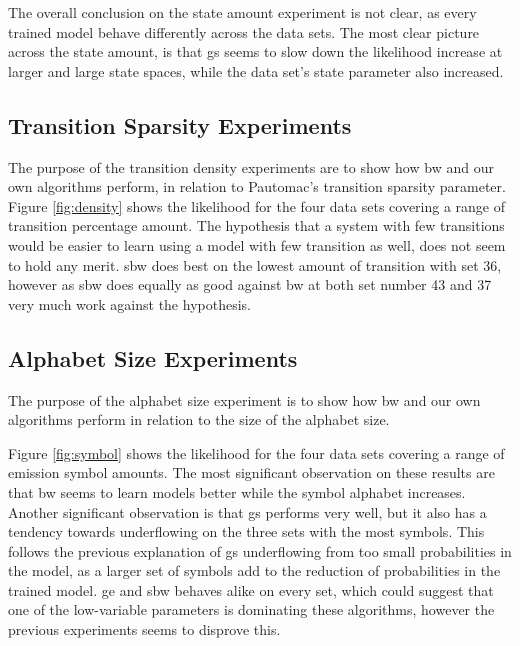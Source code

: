 The overall conclusion on the state amount experiment is not clear, as every trained model behave differently across the data sets. The most clear picture across the state amount, is that \gls{gs} seems to slow down the likelihood increase at larger and large state spaces, while the data set's state parameter also increased.\\
	
\FloatBarrier

\subsection{Transition Sparsity Experiments}

The purpose of the transition density experiments are to show how \gls{bw} and our own algorithms perform, in relation to Pautomac's transition sparsity parameter.\\

Figure \ref{fig:density} shows the likelihood for the four data sets covering a range of transition percentage amount. The hypothesis that a system with few transitions would be easier to learn using a model with few transition as well, does not seem to hold any merit. \gls{sbw} does best on the lowest amount of transition with set 36, however as \gls{sbw} does equally as good against \gls{bw} at both set number 43 and 37 very much work against the hypothesis.\\ 
	
	\FloatBarrier

\subsection{Alphabet Size Experiments}
The purpose of the alphabet size experiment is to show how \gls{bw} and our own algorithms perform in relation to the size of the alphabet size.

Figure \ref{fig:symbol} shows the likelihood for the four data sets covering a range of emission symbol amounts. The most significant observation on these results are that \gls{bw} seems to learn models better while the symbol alphabet increases. Another significant observation is that \gls{gs} performs very well, but it also has a tendency towards underflowing on the three sets with the most symbols. This follows the previous explanation of \gls{gs} underflowing from too small probabilities in the model, as a larger set of symbols add to the reduction of probabilities in the trained model.
\gls{ge} and \gls{sbw} behaves alike on every set, which could suggest that one of the low-variable parameters is dominating these algorithms, however the previous experiments seems to disprove this. \\
	
\FloatBarrier
	
